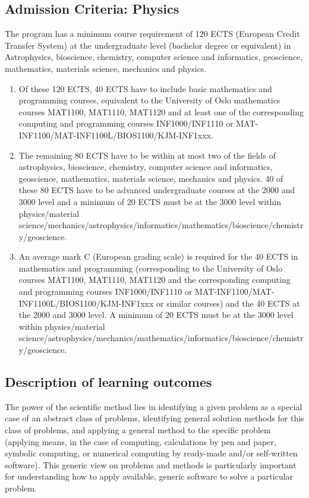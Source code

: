 \documentclass[%
oneside,                 %
final,                   %
10pt]{article}
\begin{document}
\noindent
\subsection*{Admission Criteria: Physics}
The program has a minimum course requirement of 120 ECTS (European Credit Transfer System) at the undergraduate level (bachelor degree or equivalent) in Astrophysics, bioscience, chemistry, computer science and informatics, geoscience, mathematics, materials science, mechanics and physics. 
\begin{enumerate}
\item Of these 120 ECTS, 40 ECTS have to include basic mathematics and programming courses, equivalent to the University of Oslo mathematics courses MAT1100, MAT1110, MAT1120 and at least one of the corresponding computing and programming courses INF1000/INF1110 or MAT-INF1100/MAT-INF1100L/BIOS1100/KJM-INF1xxx. 

\item The remaining 80 ECTS have to be within at most two of the fields of astrophysics, bioscience, chemistry, computer science and informatics, geoscience, mathematics, materials science, mechanics and physics. 40 of these 80 ECTS have to be advanced undergraduate courses at the 2000 and 3000 level and a minimum of 20 ECTS must be at the 3000 level within physics/material science/mechanics/astrophysics/informatics/mathematics/bioscience/chemistry/geoscience.

\item An average mark C (European grading scale) is required for the 40 ECTS in mathematics and programming (corresponding  to the University of Oslo courses  MAT1100, MAT1110, MAT1120  and the corresponding computing and programming courses INF1000/INF1110 or MAT-INF1100/MAT-INF1100L/BIOS1100/KJM-INF1xxx or similar courses) and the 40 ECTS at the 2000 and 3000 level. A minimum of 20 ECTS must be at the 3000 level within physics/material science/astrophysics/mechanics/mathematics/informatics/bioscience/chemistry/geoscience.
\end{enumerate}

\noindent
\subsection*{Description of learning outcomes}

The power of the scientific method lies in identifying a given problem
as a special case of an abstract class of problems, identifying
general solution methods for this class of problems, and applying a
general method to the specific problem (applying means, in the case of
computing, calculations by pen and paper, symbolic computing, or
numerical computing by ready-made and/or self-written software). This
generic view on problems and methods is particularly important for
understanding how to apply available, generic software to solve a
particular problem.
\end{document}
